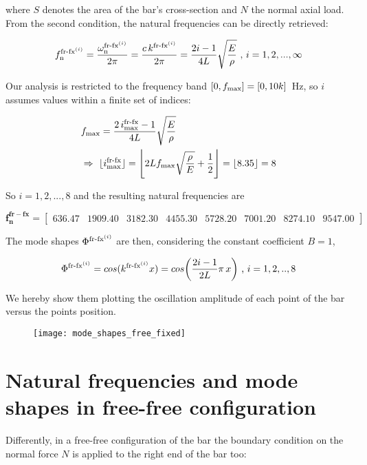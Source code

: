 \documentclass[a4paper,12pt,oneside]{article}
\begin{document}
where $ S $ denotes the area of the bar's cross-section and $ N $ the normal axial load. From the second condition, the natural frequencies can be directly retrieved:

\[
	f_\textup{n}^{\textup{fr-fx}^{(i)}} = %
		\frac{\omega_\textup{n}^{\textup{fr-fx}^{(i)}}}{2 \pi} = %
		\frac{c \, k^{\textup{fr-fx}^{(i)}}}{2 \pi} = %
		\frac{2i - 1}{4L} \sqrt{\frac{E}{\rho}} ~ \text{,} ~ i = 1,2,...,\infty
\]

Our analysis is restricted to the frequency band $ [0, f_\textup{max}] = [0, 10k] \, $ Hz, so $ i $ assumes values within a finite set of indices:

\[ \begin{split}
	& f_\textup{max} = \frac{2 \, i^\textup{fr-fx}_\textup{max} - 1}{4L} %
		\sqrt{\frac{E}{\rho}} \\
	& \Rightarrow ~ \lfloor i^\textup{fr-fx}_\textup{max} \rfloor = %
		\Biggl\lfloor 2 L f_\textup{max} %
		\sqrt{\frac{\rho}{E}} + \frac{1}{2} \Biggr\rfloor = \lfloor 8.35 \rfloor = 8
\end{split} \]

So $ i = 1,2,...,8 $ and the resulting natural frequencies are

\[
	\mathbf{f_n^{fr-fx}} =	\begin{bmatrix}
														636.47		& 1909.40	& 3182.30	& 4455.30 %
														& 5728.20	& 7001.20	& 8274.10	& 9547.00
													\end{bmatrix}
\]

The mode shapes $ \Phi^{\textup{fr-fx}^{(i)}} $ are then, considering the constant coefficient $ B = 1 $,

\[
	\Phi^{\textup{fr-fx}^{(i)}} = cos(k^{\textup{fr-fx}^{(i)}} x) = %
		cos\biggl(\frac{2i - 1}{2L} \pi \, x\biggr) ~ \text{,} ~ i = 1,2,..,8
\]

We hereby show them plotting the oscillation amplitude of each point of the bar versus the points position.

\begin{figure}[h]
	\centering
	\texttt{[image: mode\_shapes\_free\_fixed]}
\end{figure}


\section{Natural frequencies and mode shapes in free-free configuration}

Differently, in a free-free configuration of the bar the boundary condition on the normal force $ N $ is applied to the right end of the bar too:
\end{document}

